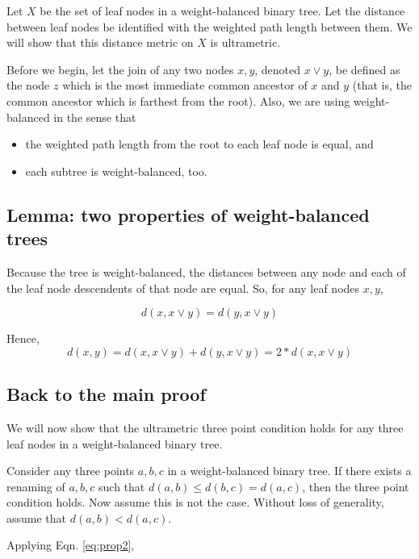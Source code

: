 \documentclass[12pt]{article}
\begin{document}
Let $X$ be the set of leaf nodes in a weight-balanced binary tree. Let the distance between leaf nodes be identified with the weighted path length between them. We will show that this distance metric on $X$ is ultrametric.  

Before we begin, let the join of any two nodes $x,y$, denoted $x \lor y$, be defined as the node $z$ which is the most immediate common ancestor of $x$ and $y$ (that is, the common ancestor which is farthest from the root). Also, we are using weight-balanced in the sense that

\begin{itemize}
\item the weighted path length from the root to each leaf node is equal, and 
\item each subtree is weight-balanced, too. 
\end{itemize}


\subsection*{Lemma: two properties of weight-balanced trees}

Because the tree is weight-balanced, the distances between any node and each of the leaf node descendents of that node are equal. So, for any leaf nodes $x,y$, 

\begin{equation} 
\label{eq:prop1} 
d(x,x \lor y) = d(y, x \lor y) \end{equation} 

Hence, 
\begin{equation} 
\label{eq:prop2} 
d(x,y) = d(x,x \lor y) + d(y, x \lor y) = 2*d(x, x \lor y) 
\end{equation}  

\subsection*{Back to the main proof}

We will now show that the ultrametric three point condition holds for any three leaf nodes in a weight-balanced binary tree. 

Consider any three points $a,b,c$ in a weight-balanced binary tree. If there exists a renaming of $a,b,c$ such that $d(a,b) \leq d(b,c) = d(a,c)$, then the three point condition holds. Now assume this is not the case. Without loss of generality, assume that $d(a,b) < d(a,c)$. 

Applying Eqn. \ref{eq:prop2}, 
\end{document}

